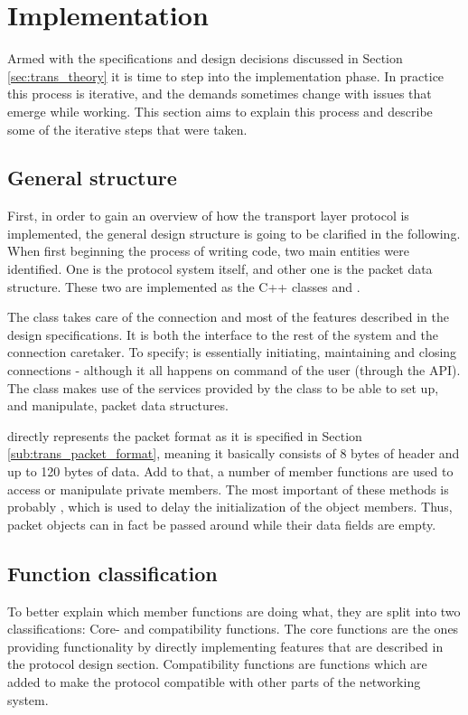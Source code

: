 \section{Implementation}\label{sec:trans_implementation}
Armed with the specifications and design decisions discussed in Section \ref{sec:trans_theory} it is time to step into the implementation phase. In practice this process is iterative, and the demands sometimes change with issues that emerge while working. This section aims to explain this process and describe some of the iterative steps that were taken.


\subsection{General structure}
First, in order to gain an overview of how the transport layer protocol is implemented, the general design structure is going to be clarified in the following. When first beginning the process of writing code, two main entities were identified. One is the protocol system itself, and other one is the packet data structure. These two are implemented as the C++ classes  and .

The  class takes care of the connection and most of the features described in the design specifications. It is both the interface to the rest of the system and the connection caretaker. To specify;  is essentially initiating, maintaining and closing connections - although it all happens on command of the user (through the API). The  class makes use of the services provided by the  class to be able to set up, and manipulate, packet data structures.

 directly represents the packet format as it is specified in Section \ref{sub:trans_packet_format}, meaning it basically consists of 8 bytes of header and up to 120 bytes of data. Add to that, a number of member functions are used to access or manipulate private members. The most important of these methods is probably , which is used to delay the initialization of the object members. Thus, packet objects can in fact be passed around while their data fields are empty.


\subsection{Function classification}
To better explain which member functions are doing what, they are split into two classifications: Core- and compatibility functions. The core functions are the ones providing functionality by directly implementing features that are described in the protocol design section. Compatibility functions are functions which are added to make the protocol compatible with other parts of the networking system.

